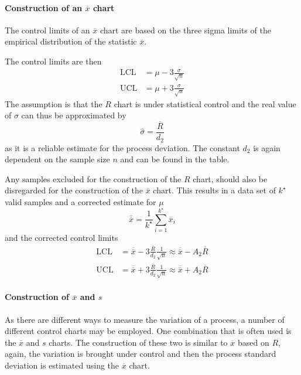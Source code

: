 \documentclass[11pt]{article}
\theoremstyle{definition}
\newcommand*\samplemean[1]{\overline{#1}}
\begin{document}
\paragraph{Construction of an $\samplemean{x}$ chart} The control limits of an $\samplemean{x}$ chart are based on the three sigma limits of the empirical distribution of the statistic $\samplemean{x}$.

The control limits are then
\begin{align}
	\text{LCL} &= \mu - 3 \frac{\sigma}{\sqrt{n}}\\
	\text{UCL} &= \mu + 3 \frac{\sigma}{\sqrt{n}}
\end{align}
The assumption is that the $R$ chart is under statistical control and the real value of $\sigma$ can thus be approximated by
\begin{equation*}
	\hat{\sigma} = \frac{\samplemean{R}}{d_2}
\end{equation*}
as it is a reliable estimate for the process deviation. The constant $d_2$ is again dependent on the sample size $n$ and can be found in the table.

Any samples excluded for the construction of the $R$ chart, should also be disregarded for the construction of the $\samplemean{x}$ chart. This results in a data set of $k^\star$ valid samples and a corrected estimate for $\mu$
\begin{equation*}
	\samplemean{\samplemean{x}} = \frac{1}{k^\star}\sum_{i=1}^{k^\star}\samplemean{x}_i
\end{equation*}
and the corrected control limits
\begin{align*}
	\text{LCL} &= \samplemean{\samplemean{x}} - 3 \frac{\samplemean{R}}{d_2}\frac{1}{\sqrt{n}} \approx \samplemean{\samplemean{x}} - A_2\samplemean{R} \\
	\text{UCL} &= \samplemean{\samplemean{x}} + 3 \frac{\samplemean{R}}{d_2}\frac{1}{\sqrt{n}} \approx \samplemean{\samplemean{x}} + A_2\samplemean{R}
\end{align*}

\paragraph{Construction of $\samplemean{x}$ and $s$} As there are different ways to measure the variation of a process, a number of different control charts may be employed. One combination that is often used is the $\samplemean{x}$ and $s$ charts. The construction of these two is similar to $\samplemean{x}$ based on $R$, again, the variation is brought under control and then the process standard deviation is estimated using the $\samplemean{x}$ chart.
\end{document}
